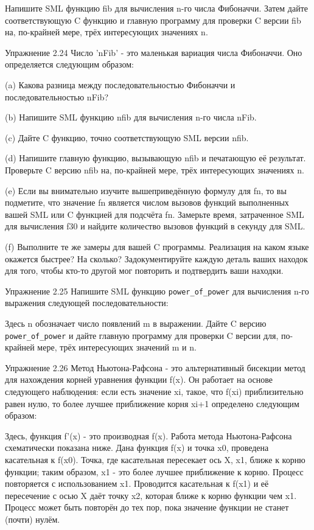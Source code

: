 Напишите SML функцию fib для вычисления n-го числа Фибоначчи. Затем дайте соответствующую C функцию и главную программу для проверки C версии fib на, по-крайней мере, трёх интересующих значениях n.

Упражнение 2.24 Число 'nFib' - это маленькая вариация числа Фибоначчи. Оно определяется следующим образом:

(a) Какова разница между последовательностью Фибоначчи и последовательностью nFib?

(b) Напишите SML функцию nfib для вычисления n-го числа nFib.

(c) Дайте C функцию, точно соответствующую SML версии nfib.

(d) Напишите главную функцию, вызывающую nfib и печатающую её результат. Проверьте C версию nfib на, по-крайней мере, трёх интересующих значениях n.

(e) Если вы внимательно изучите вышеприведённую формулу для fn, то вы подметите, что значение fn является числом вызовов функций выполненных вашей SML или C функцией для подсчёта fn. Замерьте время, затраченное SML для вычисления f30 и найдите количество вызовов функций в секунду для SML.

(f) Выполните те же замеры для вашей C программы. Реализация на каком языке окажется быстрее? На сколько? Задокументируйте каждую деталь ваших находок для того, чтобы кто-то другой мог повторить и подтвердить ваши находки.

Упражнение 2.25 Напишите SML функцию \lstinline|power_of_power| для вычисления n-го выражения следующей последовательности:

Здесь n обозначает число появлений m в выражении. Дайте C версию \lstinline|power_of_power| и дайте главную программу для проверки C версии для, по-крайней мере, трёх интересующих значений m и n.

Упражнение 2.26 Метод Ньютона-Рафсона - это альтернативный бисекции метод для нахождения корней уравнения функции f(x). Он работает на основе следующего наблюдения: если есть значение xi, такое, что f(xi) приблизительно равен нулю, то более лучшее приближение корня xi+1 определено следующим образом:

Здесь, функция f'(x) - это производная f(x). Работа метода Ньютона-Рафсона схематически показана ниже. Дана функция f(x) и точка x0, проведена касательная к f(x0). Точка, где касательная пересекает ось X, x1, ближе к корню функции; таким образом, x1 - это более лучшее приближение к корню. Процесс повторяется с использованием x1. Проводится касательная к f(x1) и её пересечение с осью X даёт точку x2, которая ближе к корню функции чем x1. Процесс может быть повторён до тех пор, пока значение функции не станет (почти) нулём.

